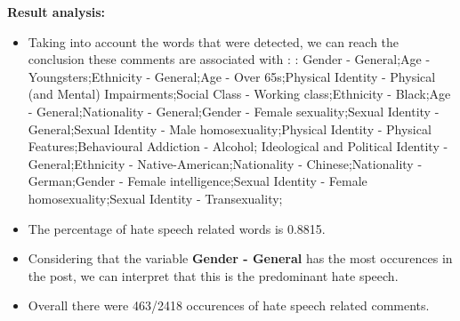 \documentclass[11pt]{article}
\begin{document}
\textbf{\Large Result analysis:}

\begin{itemize}\item Taking into account the words that were detected, we can reach the conclusion these comments are associated with : : Gender - General;Age - Youngsters;Ethnicity - General;Age - Over 65s;Physical Identity - Physical (and Mental) Impairments;Social Class - Working class;Ethnicity - Black;Age - General;Nationality - General;Gender - Female sexuality;Sexual Identity - General;Sexual Identity - Male homosexuality;Physical Identity - Physical Features;Behavioural Addiction - Alcohol; Ideological and Political Identity - General;Ethnicity - Native-American;Nationality - Chinese;Nationality - German;Gender - Female intelligence;Sexual Identity - Female homosexuality;Sexual Identity - Transexuality;%

\item The percentage of hate speech related words is 0.8815.

\item Considering that the variable \textbf{Gender - General} has the most occurences in the post, we can interpret that this is the predominant hate speech.

\item Overall there were 463/2418 occurences of hate speech related comments.\end{itemize}
\end{document}
